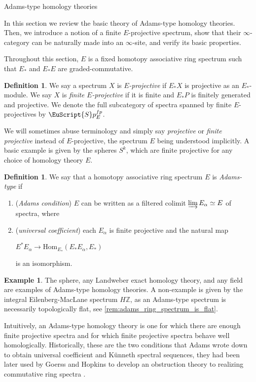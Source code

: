 \documentclass[oneside,a4paper]{amsart}
\makeatletter
\newcommand{\euscr}[1]{\EuScript{#1}} %
\newcommand{\spectra}{\euscr{S}p} %
\theoremstyle{plain}
\theoremstyle{definition}
\newtheorem{example}[thm]{Example}
\newtheorem{defin}[thm]{Definition}
\theoremstyle{remark}
\def\subsection{\@startsection{subsection}{1}%
  \z@{.7\linespacing\@plus\linespacing}{.5\linespacing}%
  {\normalfont\bfseries\centering}}%
\makeatother
\begin{document}
\subsection{Adams-type homology theories}

In this section we review the basic theory of Adams-type homology theories. Then, we introduce a notion of a finite $E$-projective spectrum, show that their $\infty$-category can be naturally made into an $\infty$-site, and verify its basic properties. 

Throughout this section, $E$ is a fixed homotopy associative ring spectrum such that $E_{*}$ and $E_{*}E$ are graded-commutative. 

\begin{defin}
We say a spectrum $X$ is \emph{$E$-projective} if $E_{*}X$ is projective as an $E_{*}$-module. We say $X$ is \emph{finite $E$-projective} if it is finite and $E_{*}P$ is finitely generated and projective. We denote the full subcategory of spectra spanned by finite $E$-projectives by $\spectra_{E}^{fp}$. 
\end{defin}
We will sometimes abuse terminology and simply say \emph{projective} or \emph{finite projective} instead of $E$-projective, the spectrum $E$ being understood implicitly. A basic example is given by the spheres $S^{k}$, which are finite projective for any choice of homology theory $E$. 

\begin{defin}
\label{defin:adams_type_ring_spectrum}
We say that a homotopy associative ring spectrum $E$ is \emph{Adams-type} if 

\begin{enumerate}
\item (\emph{Adams condition}) $E$ can be written as a filtered colimit $\varinjlim E_{\alpha} \simeq E$ of spectra, where 
\item (\emph{universal coefficient}) each $E_{\alpha}$ is finite projective and the natural map 

\begin{center}
$E^{*}E_{\alpha} \rightarrow \mathrm{Hom}_{E_{*}}(E_{*}E_{\alpha}, E_{*})$
\end{center}
is an isomorphism.
\end{enumerate}
\end{defin}

\begin{example}
The sphere, any Landweber exact homology theory, and any field are examples of Adams-type homology theories. A non-example is given by the integral Eilenberg-MacLane spectrum $H\mathbb{Z}$, as an Adams-type spectrum is necessarily topologically flat, see \cref{rem:adams_ring_spectrum_is_flat}.
\end{example}
Intuitively, an Adams-type homology theory is one for which there are enough finite projective spectra and for which finite projective spectra behave well homologically. Historically, these are the two conditions that Adams wrote down to obtain universal coefficient and K\"{u}nneth spectral sequences, they had been later used by Goerss and Hopkins to develop an obstruction theory to realizing commutative ring spectra \cite{moduli_spaces_of_commutative_ring_spectra}. 
\end{document}

